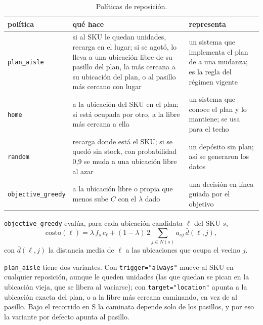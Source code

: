 \documentclass[11pt,a4paper,oneside]{report}
\newcommand{\code}[1]{\texttt{\small #1}}
\begin{document}
\begin{table}[ht]
\centering\small
\begin{tabularx}{\textwidth}{@{}l L L@{}}
\toprule
política & qué hace & representa \\
\midrule
\code{plan\_aisle} & si al SKU le quedan unidades, recarga en el lugar; si se agotó, lo lleva a una ubicación libre de su pasillo del plan, la más cercana a su ubicación del plan, o al pasillo más cercano con lugar & un sistema que implementa el plan de a una mudanza; es la regla del régimen vigente \\
\code{home} & a la ubicación del SKU en el plan; si está ocupada por otro, a la libre más cercana a ella & un sistema que conoce el plan y lo mantiene; se usa para el techo \\
\code{random} & recarga donde está el SKU; si se quedó sin stock, con probabilidad 0,9 se muda a una ubicación libre al azar & un depósito sin plan; así se generaron los datos \\
\code{objective\_greedy} & a la ubicación libre o propia que menos sube $C$ con el $\lambda$ dado & una decisión en línea guiada por el objetivo \\
\bottomrule
\end{tabularx}
\caption{Políticas de reposición.}
\end{table}

\code{objective\_greedy} evalúa, para cada ubicación candidata $\ell$ del SKU $s$,
\[
\text{costo}(\ell) = \lambda\, f_s\, c_\ell + (1-\lambda)\, 2 \sum_{j \in N(s)} a_{sj}\,
\bar d(\ell, j),
\]
con $\bar d(\ell, j)$ la distancia media de $\ell$ a las ubicaciones que ocupa el vecino $j$.

\code{plan\_aisle} tiene dos variantes. Con \code{trigger="always"} mueve al SKU en cualquier
reposición, aunque le queden unidades (las que quedan se pican en la ubicación vieja, que se
libera al vaciarse); con \code{target="location"} apunta a la ubicación exacta del plan, o a la
libre más cercana caminando, en vez de al pasillo. Bajo el recorrido en S la caminata depende
solo de los pasillos, y por eso la variante por defecto apunta al pasillo.
\end{document}
